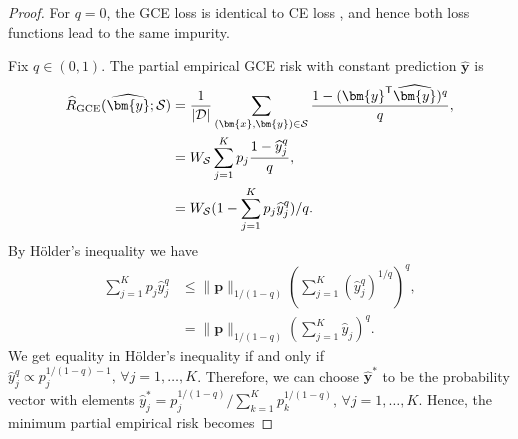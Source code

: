 \documentclass[letterpaper]{article} %
\newcommand{\bx}{{\bm{x}}}
\newcommand{\bp}{{\bm{p}}}
\newcommand{\by}{{\bm{y}}}
\newcommand{\T}{{\mathsf{T}}}
\newcommand{\cS}{{\cal{S}}}
\newcommand{\cD}{{\cal{D}}}
\newcommand{\WS}{{W_{\cal{S}}}}
\begin{document}
\begin{proof}
    
    \medskip{} 
    For $q=0$, the GCE loss is identical to CE loss \cite{zhang2018generalized}, and hence both loss functions lead to the same impurity. 
    
    Fix $q\in(0,1)$. The partial empirical GCE risk with constant prediction $\widehat{\by}$ is
    \begin{align*}
        \widehat{R}_{\mathrm{GCE}}(\widehat{\by};\cS) &= \frac{1}{|\cD|} \sum_{(\bx,\by)\in\cS} \frac{1-(\by^\T\widehat{\by})^q}{q},
        \\
        &= \WS\sum_{j=1}^K p_j \frac{1-\widehat{y}_j^q}{q},
        \\
        &= \WS (
        1-\sum_{j=1}^K p_j \widehat{y}_j^q
        )/q.
    \end{align*}
    By H\"{o}lder's inequality we have 
    \begin{align*}
        \sum_{j=1}^K p_j\widehat{y}_j^q 
        &\leq \|\bp\|_{1/(1-q)} \left( \sum_{j=1}^K (\widehat{y}_j^{q})^{1/q} \right)^{q}, 
        \\
        &= \|\bp\|_{1/(1-q)} \left( \sum_{j=1}^K \widehat{y}_j \right)^{q}. 
    \end{align*}
    We get equality in H\"older's inequality if and only if 
    $\widehat{y}_j^q \propto p_j^{1/(1-q)-1},\,\forall j=1,\ldots,K$. 
    Therefore, we can choose $\widehat{\by}^*$ to be the probability vector with elements 
    $\widehat{y}_j^* = p_j^{1/(1-q)}/\sum_{k=1}^K p_k^{1/(1-q)},\,\forall j=1,\ldots,K$. Hence, the minimum partial empirical risk becomes

\end{proof}
\end{document}
